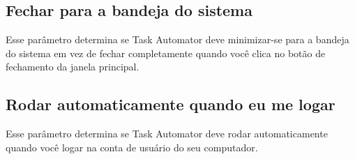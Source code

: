 \documentclass{article}
\begin{document}
\subsection{Fechar para a bandeja do sistema}
Esse parâmetro determina se Task Automator deve minimizar-se para a bandeja do sistema em vez de fechar completamente quando você clica no botão de fechamento da janela principal.

\subsection{Rodar automaticamente quando eu me logar}
Esse parâmetro determina se Task Automator deve rodar automaticamente quando você logar na conta de usuário do seu computador.
\end{document}
